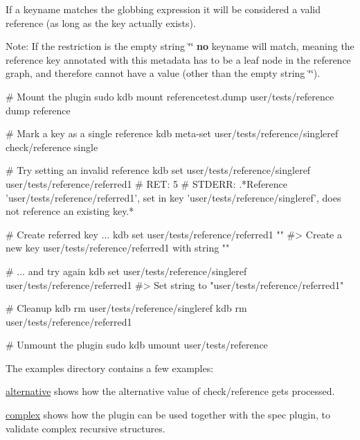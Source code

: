 If a keyname matches the globbing expression it will be considered a valid reference (as long as the key actually exists).

Note\+: If the restriction is the empty string {\ttfamily \char`\"{}\char`\"{}} {\bfseries no} keyname will match, meaning the reference key annotated with this metadata has to be a leaf node in the reference graph, and therefore cannot have a value (other than the empty string {\ttfamily \char`\"{}\char`\"{}}).


\begin{DoxyCode}
# Mount the plugin
sudo kdb mount referencetest.dump user/tests/reference dump reference

# Mark a key as a single reference
kdb meta-set user/tests/reference/singleref check/reference single

# Try setting an invalid reference
kdb set user/tests/reference/singleref user/tests/reference/referred1
# RET: 5
# STDERR: .*Reference 'user/tests/reference/referred1', set in key 'user/tests/reference/singleref', does
       not reference an existing key.*

# Create referred key ...
kdb set user/tests/reference/referred1 ""
#> Create a new key user/tests/reference/referred1 with string ""

# ... and try again
kdb set user/tests/reference/singleref user/tests/reference/referred1
#> Set string to "user/tests/reference/referred1"

# Cleanup
kdb rm user/tests/reference/singleref
kdb rm user/tests/reference/referred1

# Unmount the plugin
sudo kdb umount user/tests/reference
\end{DoxyCode}


The examples directory contains a few examples\+:


\begin{DoxyItemize}
\item \hyperlink{autotoc_md594_src_plugins_reference_examples_alternative_README_md}{alternative} shows how the {\ttfamily alternative} value of {\ttfamily check/reference} gets processed.
\item \hyperlink{autotoc_md595_src_plugins_reference_examples_complex_README_md}{complex} shows how the plugin can be used together with the spec plugin, to validate complex recursive structures. 
\end{DoxyItemize}